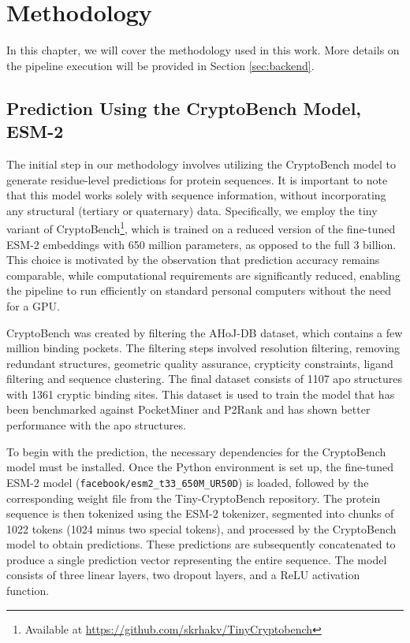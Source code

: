 \chapter{Methodology}
\label{chap:methodology}

In this chapter, we will cover the methodology used in this work. More details on the pipeline execution will be provided in Section \ref{sec:backend}.

\section{Prediction Using the CryptoBench Model, ESM-2}
\label{sec:prediction}

The initial step in our methodology involves utilizing the CryptoBench \cite{vskrhak2025cryptobench} model to generate residue-level predictions for protein sequences. It is important to note that this model works solely with sequence information, without incorporating any structural (tertiary or quaternary) data. Specifically, we employ the tiny variant of CryptoBench\footnote{Available at \url{https://github.com/skrhakv/TinyCryptobench}}, which is trained on a reduced version of the fine-tuned ESM-2 embeddings \cite{lin2022language} with 650 million parameters, as opposed to the full 3 billion. This choice is motivated by the observation that prediction accuracy remains comparable, while computational requirements are significantly reduced, enabling the pipeline to run efficiently on standard personal computers without the need for a GPU.

CryptoBench was created by filtering the AHoJ-DB \cite{feidakis2024ahoj} dataset, which contains a few million binding pockets. The filtering steps involved resolution filtering, removing redundant structures, geometric quality assurance, crypticity constraints, ligand filtering and sequence clustering. The final dataset consists of 1107 apo structures with 1361 cryptic binding sites. This dataset is used to train the model that has been benchmarked against PocketMiner \cite{meller2023predicting} and P2Rank \cite{krivak2018p2rank} and has shown better performance with the apo structures.

\sloppy
To begin with the prediction, the necessary dependencies for the CryptoBench model must be installed. Once the Python environment is set up, the fine-tuned ESM-2 model (\lstinline!facebook/esm2_t33_650M_UR50D!) is loaded, followed by the corresponding weight file from the Tiny-CryptoBench repository. The protein sequence is then tokenized using the ESM-2 tokenizer, segmented into chunks of 1022 tokens (1024 minus two special tokens), and processed by the CryptoBench model to obtain predictions. These predictions are subsequently concatenated to produce a single prediction vector representing the entire sequence. The model consists of three linear layers, two dropout layers, and a ReLU activation function.

